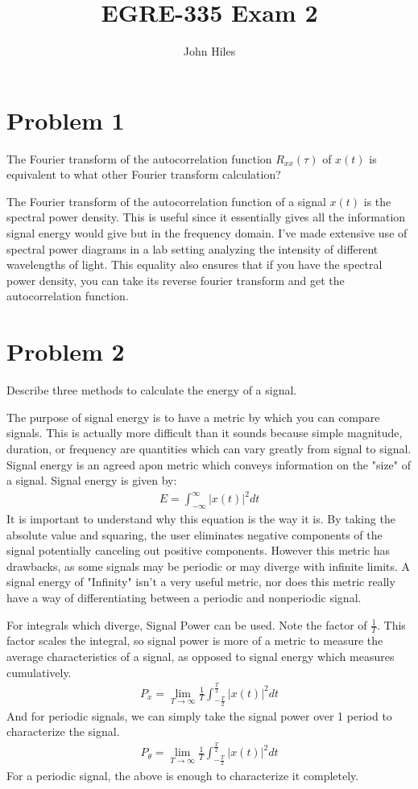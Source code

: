 \documentclass{article}
\title{EGRE-335 Exam 2}
\author{John Hiles}
\begin{document}
\maketitle %


\section*{Problem 1}
The Fourier transform of the autocorrelation function $R_{xx}(\tau)$ of $x(t)$ is equivalent to what other Fourier transform calculation?

The Fourier transform of the autocorrelation function of a signal $x(t)$ is the spectral power density. This is useful since it essentially gives all the information signal energy would give but in the frequency domain. I've made extensive use of spectral power diagrams in a lab setting analyzing the intensity of different wavelengths of light. This equality also ensures that if you have the spectral power density, you can take its reverse fourier transform and get the autocorrelation function.
\pagebreak
\section*{Problem 2}
Describe three methods to calculate the energy of a signal.

The purpose of signal energy is to have a metric by which you can compare signals. This is actually more difficult than it sounds because simple magnitude, duration, or frequency are quantities which can vary greatly from signal to signal. Signal energy is an agreed apon metric which conveys information on the "size" of a signal. Signal energy is given by:
\begin{align*}
E = \int_{-\infty}^{\infty} |x(t)|^2 dt
\end{align*}
It is important to understand why this equation is the way it is. By taking the absolute value and squaring, the user eliminates negative components of the signal potentially canceling out positive components. However this metric has drawbacks, as some signals may be periodic or may diverge with infinite limits. A signal energy of "Infinity" isn't a very useful metric, nor does this metric really have a way of differentiating between a periodic and nonperiodic signal.

For integrals which diverge, Signal Power can be used. Note the factor of $\frac{1}{T}$. This factor scales the integral, so signal power is more of a metric to measure the average characteristics of a signal, as opposed to signal energy which measures cumulatively.
\begin{align*}
P_x = \lim_{T\rightarrow \infty} \frac{1}{T} \int_{-\frac{T}{2}}^{\frac{T}{2}} |x(t)|^2 dt
\end{align*}
And for periodic signals, we can simply take the signal power over 1 period to characterize the signal.
\begin{align*}
P_\theta = \lim_{T\rightarrow \infty} \frac{1}{T} \int_{-\frac{T}{2}}^{\frac{T}{2}} |x(t)|^2 dt
\end{align*}
For a periodic signal, the above is enough to characterize it completely.
\end{document}
